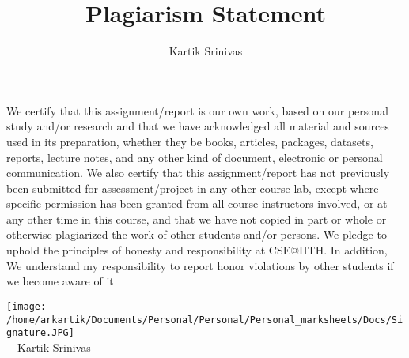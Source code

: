\title{Plagiarism Statement}
\author{Kartik Srinivas}
\maketitle
We certify that this assignment/report is our own work, based on our personal
study and/or research and that we have acknowledged all material and sources 
used in its preparation, whether they be books, articles, packages, datasets, reports, lecture notes, and any other kind of document, electronic or personal communication. We also
certify that this assignment/report has not previously been submitted for
assessment/project in any other course lab, except where specific permission has been granted
from all course instructors involved, or at any other time in this course, and that we
have not copied in part or whole or otherwise plagiarized the work of other
students and/or persons. We pledge to uphold the principles of honesty and responsibility at
CSE@IITH. In addition, We understand my responsibility to report honor violations by other
students if we become aware of it
\vspace{30pt}

{\texttt{[image: /home/arkartik/Documents/Personal/Personal/Personal\_marksheets/Docs/Signature.JPG]}}
\\
\ \ Kartik Srinivas
